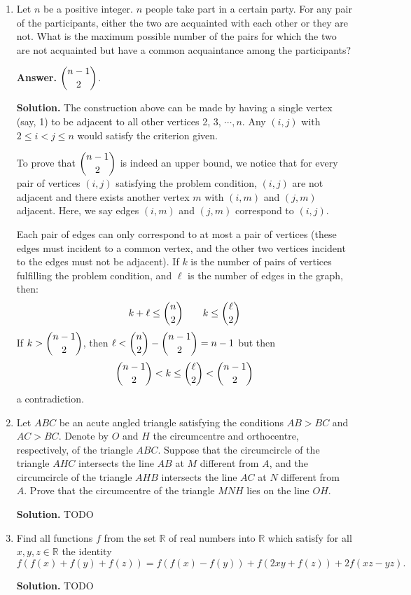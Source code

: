 \documentclass[11pt,a4paper]{article}
\begin{document}
\begin{enumerate}
	\item Let $n$ be a positive integer. $n$ people take part in a certain party. For any pair of the participants, either the two are acquainted with each other or they are not. What is the maximum possible number of the pairs for which the two are not acquainted but have a common acquaintance among the participants?
	
	\textbf{Answer.} $\dbinom{n-1}{2}$. 
	
	\textbf{Solution.} The construction above can be made by having a single vertex (say, 1) to be adjacent to all other vertices 2, 3, $\cdots , n$. Any $(i, j)$ with $2\le i<j\le n$ would satisfy the criterion given. 
	
	To prove that $\dbinom{n-1}{2}$ is indeed an upper bound, we notice that for every pair of vertices $(i, j)$ satisfying the problem condition, $(i, j)$ are not adjacent and there exists another vertex $m$ with $(i, m)$ and $(j, m)$ adjacent. Here, we say edges $(i, m)$ and $(j, m)$ correspond to $(i, j)$. 
	
	Each pair of edges can only correspond to at most a pair of vertices (these edges must incident to a common vertex, and the other two vertices incident to the edges must not be adjacent). 
	If $k$ is the number of pairs of vertices fulfilling the problem condition, and $\ell$ is the number of edges in the graph, then: 
	\[
	k+\ell\le \dbinom{n}{2}\qquad k\le \dbinom{\ell}{2}
	\]
	If $k> \dbinom{n-1}{2}$, then $\ell<\dbinom{n}{2}-\dbinom{n-1}{2}=n-1$ but then 
	\[
	\dbinom{n-1}{2}<k\le \dbinom{\ell}{2}<\dbinom{n-1}{2}
	\]
	a contradiction. 
	
	\item Let $ABC$ be an acute angled triangle satisfying the conditions $AB>BC$ and $AC>BC$. Denote by $O$ and $H$ the circumcentre and orthocentre, respectively, of the triangle $ABC.$ Suppose that the circumcircle of the triangle $AHC$ intersects the line $AB$ at $M$ different from $A$, and the circumcircle of the triangle $AHB$ intersects the line $AC$ at $N$ different from $A.$ Prove that the circumcentre of the triangle $MNH$ lies on the line $OH$.
	
	\textbf{Solution.} TODO
	
	\item Find all functions $f$ from the set $\mathbb{R}$ of real numbers into $\mathbb{R}$ which satisfy for all $x, y, z \in \mathbb{R}$ the identity \[f(f(x)+f(y)+f(z))=f(f(x)-f(y))+f(2xy+f(z))+2f(xz-yz).\]
	
	\textbf{Solution.} TODO
\end{enumerate}
\end{document}
